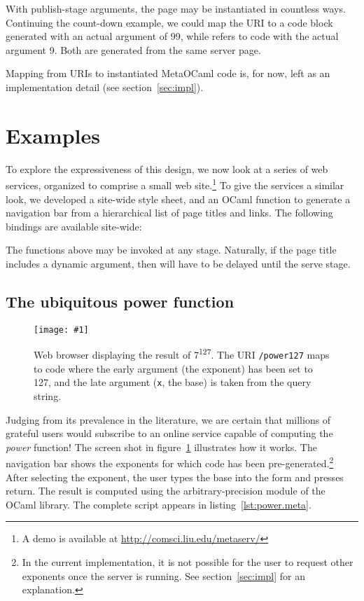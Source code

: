 \documentclass[preprint]{acm_proc_article-sp}
\def\MOC{MetaOCaml\xspace}
\newcommand{\myfig}[3]{%
  \begin{figure}[tbp]%
    #3%
    \caption{#2}%
    \label{fig:#1}%
  \end{figure}}
\newcommand{\screenshot}[2]{%
  \myfig{#1}{#2}
  {\centering%
    \texttt{[image: \#1]}}}
\newcounter{listing}
\begin{document}
With publish-stage arguments, the page may be instantiated in
countless ways.  Continuing the count-down example, we could map the
URI  to a code block generated with an actual argument
of 99, while  refers to code with the actual
argument 9.  Both are generated from the same server page.


Mapping from URIs to instantiated \MOC code is, for now, left as an
implementation detail (see section~\ref{sec:impl}).

\section{Examples}
\label{sec:eg}

To explore the expressiveness of this design, we now look at a
series of web services, organized to comprise a small web
site.\footnote{A demo is available at
  \url{http://comsci.liu.edu/metaserv/}}
To give the services a similar look, we developed a site-wide style
sheet, and an OCaml function to generate a navigation bar from a
hierarchical list of page titles and links.  The following bindings are
available site-wide:

The functions above may be invoked at any stage.  Naturally, if the
page title includes a dynamic argument, then  will have
to be delayed until the serve stage.

\subsection{The ubiquitous power function}
\label{sec:eg:power}

\screenshot{power127}{Web browser displaying the result of
  7\textsuperscript{127}.  The URI \texttt{/power127} maps to code
  where the early argument (the exponent) has been set to 127, and the
  late argument (\texttt{x}, the base) is taken from the query
  string.}

Judging from its prevalence in the literature, we are certain that
millions of grateful users would subscribe to an online service
capable of computing the \emph{power} function!  The screen shot in
figure~\ref{fig:power127} illustrates how it works.  The navigation
bar shows the exponents for which code has been
pre-generated.\footnote{In the current implementation, it is not
  possible for the user to request other exponents once the server is
  running.  See section~\ref{sec:impl} for an explanation.}  After
selecting the exponent, the user types the base into the form and
presses return.  The result is computed using the arbitrary-precision
 module of the OCaml library.  The complete script appears in
listing~\ref{lst:power.meta}.
\end{document}
